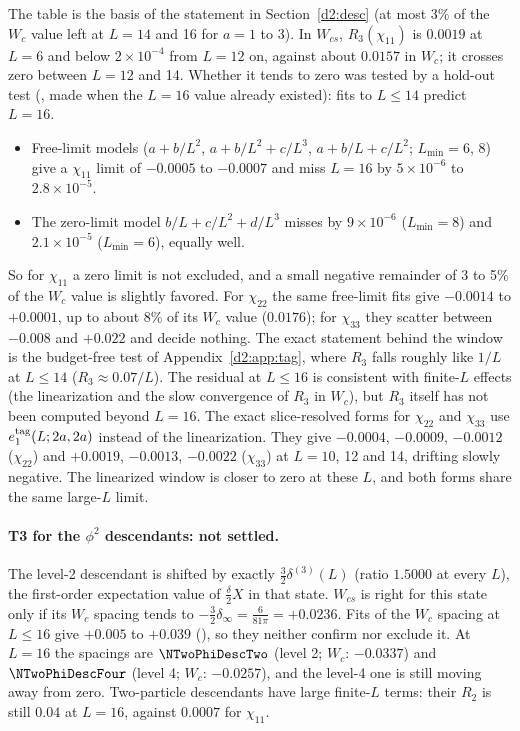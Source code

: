 The table is the basis of the statement in Section~\ref{d2:desc} (at most 3\% of the $W_c$ value left at $L=14$ and 16
for $a=1$ to 3). In $W_{cs}$, $R_3(\chi_{11})$ is $0.0019$ at $L=6$ and below $2\times10^{-4}$ from $L=12$
on, against about $0.0157$ in $W_c$; it crosses zero between $L=12$ and 14. Whether it tends to zero was tested by a hold-out test (, made when the $L=16$ value already existed):
fits to $L\le14$ predict $L=16$.
\begin{itemize}
\item Free-limit models ($a+b/L^2$, $a+b/L^2+c/L^3$, $a+b/L+c/L^2$; $L_{\min}=6$, 8) give a $\chi_{11}$ limit of $-0.0005$ to
 $-0.0007$ and miss $L=16$ by $5\times10^{-6}$ to $2.8\times10^{-5}$.
\item The zero-limit model $b/L+c/L^2+d/L^3$ misses by $9\times10^{-6}$ ($L_{\min}=8$) and $2.1\times10^{-5}$ ($L_{\min}=6$), equally
 well.
\end{itemize}
So for $\chi_{11}$ a zero limit is not excluded, and a small negative remainder of 3 to 5\% of the $W_c$ value is slightly
favored. For $\chi_{22}$ the same free-limit fits give $-0.0014$ to $+0.0001$, up to about 8\% of its $W_c$ value ($0.0176$); for
$\chi_{33}$ they scatter between $-0.008$ and $+0.022$ and decide nothing. The exact statement behind the window
is the budget-free test of Appendix~\ref{d2:app:tag}, where $R_3$ falls roughly like $1/L$ at $L\le14$ ($R_3\approx0.07/L$). The residual at $L\le16$ is consistent with
finite-$L$ effects (the linearization and the slow convergence of $R_3$ in $W_c$), but $R_3$ itself has not been computed
beyond $L=16$. The exact slice-resolved forms for $\chi_{22}$ and $\chi_{33}$ use $e_1^{\rm tag}(L;2a,2a)$ instead of the
linearization. They give $-0.0004$, $-0.0009$, $-0.0012$ ($\chi_{22}$) and $+0.0019$, $-0.0013$, $-0.0022$ ($\chi_{33}$) at
$L=10$, 12 and 14, drifting slowly negative. The linearized window is closer to zero at these $L$, and both forms share the
same large-$L$ limit.

\paragraph{T3 for the $\phi^2$ descendants: not settled.} The level-2 descendant is shifted by exactly $\frac32\delta^{(3)}(L)$
(ratio $1.5000$ at every $L$), the first-order expectation value of $\frac\delta2X$ in that state. $W_{cs}$ is right for this
state only if its $W_c$ spacing tends to $-\frac32\delta_\infty=\frac6{81\pi}=+0.0236$. Fits of the $W_c$ spacing at $L\le16$
give $+0.005$ to $+0.039$ (), so they neither confirm nor exclude it. At $L=16$ the spacings are
$\NTwoPhiDescTwo$ (level 2; $W_c$: $-0.0337$) and $\NTwoPhiDescFour$ (level 4; $W_c$: $-0.0257$), and the level-4 one is still
moving away from zero. Two-particle descendants have large finite-$L$ terms: their $R_2$ is still $0.04$ at $L=16$, against
$0.0007$ for $\chi_{11}$.

